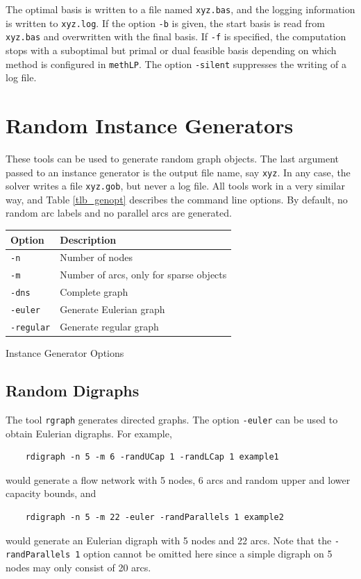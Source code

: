 \documentclass[a4paper,11pt,twoside]{book}
\begin{document}
\begin{multicols}{2}
The optimal basis is written to a file named \verb/xyz.bas/, and the logging
information is written to \verb/xyz.log/. If the option \verb/-b/ is given,
the start basis is read from \verb/xyz.bas/ and overwritten with the final
basis. If \verb/-f/ is specified, the computation stops with a suboptimal but
primal or dual feasible basis depending on which method is configured in
\verb/methLP/. The option \verb/-silent/ suppresses the writing of a log file.



\section{Random Instance Generators}
These tools can be used to generate random graph objects.
The last argument passed to an instance generator is the output file name, say
\verb/xyz/. In any case, the solver writes a file \verb/xyz.gob/, but never a
log file. All tools work in a very similar way, and Table \ref{tlb_genopt}
describes the command line options. By default, no random arc labels and no
parallel arcs are generated.
\begin{tablehere}
\begin{center}
\begin{tabular}{|l|l|}
\hline
Option              & Description \\
\hline
\verb/-n/           & Number of nodes \\
\hline
\verb/-m/           & Number of arcs, only for sparse objects \\
\hline
\verb/-dns/         & Complete graph \\
\hline
\verb/-euler/        & Generate Eulerian graph \\
\hline
\verb/-regular/      & Generate regular graph \\
\hline
\end{tabular}
\end{center}
\caption{\label{tlb_genopt}Instance Generator Options}
\end{tablehere}


\subsection{Random Digraphs}
The tool \verb/rgraph/ generates directed graphs. The option \verb/-euler/ can be used
to obtain Eulerian digraphs. For example,
\begin{verbatim}
    rdigraph -n 5 -m 6 -randUCap 1 -randLCap 1 example1
\end{verbatim}
would generate a flow network with 5 nodes, 6 arcs and random upper and lower
capacity bounds, and
\begin{verbatim}
    rdigraph -n 5 -m 22 -euler -randParallels 1 example2
\end{verbatim}
would generate an Eulerian digraph with 5 nodes and 22 arcs. Note that the
\verb/-randParallels 1/ option cannot be omitted here since a simple digraph
on 5 nodes may only consist of 20 arcs.




\end{multicols}
\end{document}
